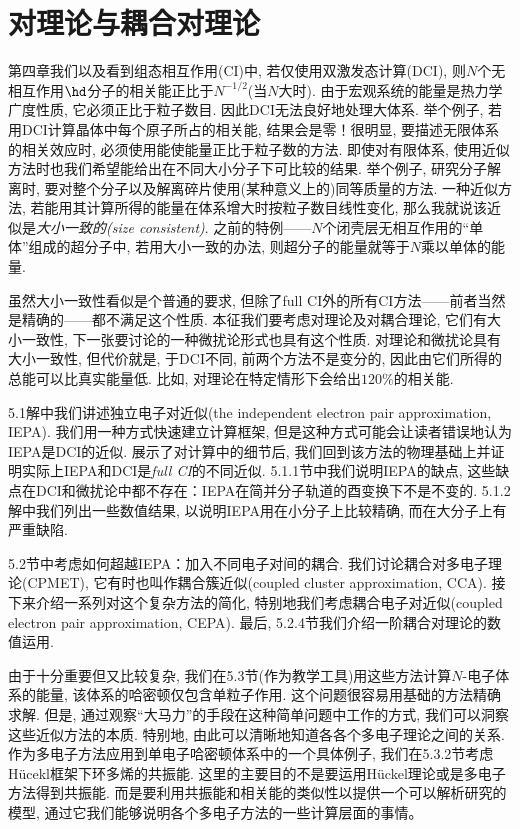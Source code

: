 \chapter{对理论与耦合对理论}
第四章我们以及看到组态相互作用(CI)中, 若仅使用双激发态计算(DCI), 则$N$个无相互作用$\hd$分子的相关能正比于$N^{-1/2}$(当$N$大时). 由于宏观系统的能量是热力学广度性质, 它必须正比于粒子数目. 因此DCI无法良好地处理大体系. 举个例子, 若用DCI计算晶体中每个原子所占的相关能, 结果会是零！很明显, 要描述无限体系的相关效应时, 必须使用能使能量正比于粒子数的方法. 即使对有限体系, 使用近似方法时也我们希望能给出在不同大小分子下可比较的结果. 举个例子, 研究分子解离时, 要对整个分子以及解离碎片使用(某种意义上的)同等质量的方法. 一种近似方法, 若能用其计算所得的能量在体系增大时按粒子数目线性变化, 那么我就说该近似是\emph{大小一致的(size consistent)}. 之前的特例——$N$个闭壳层无相互作用的``单体''组成的超分子中, 若用大小一致的办法, 则超分子的能量就等于$N$乘以单体的能量.

虽然大小一致性看似是个普通的要求, 但除了full CI外的所有CI方法——前者当然是精确的——都不满足这个性质. 本征我们要考虑对理论及对耦合理论, 它们有大小一致性, 下一张要讨论的一种微扰论形式也具有这个性质. 对理论和微扰论具有大小一致性, 但代价就是, 于DCI不同, 前两个方法不是变分的, 因此由它们所得的总能可以比真实能量低. 比如, 对理论在特定情形下会给出$120\%$的相关能.

5.1解中我们讲述独立电子对近似(the independent electron pair approximation, IEPA). 我们用一种方式快速建立计算框架, 但是这种方式可能会让读者错误地认为IEPA是DCI的近似. 展示了对计算中的细节后, 我们回到该方法的物理基础上并证明实际上IEPA和DCI是\emph{full CI}的不同近似. 5.1.1节中我们说明IEPA的缺点, 这些缺点在DCI和微扰论中都不存在：IEPA在简并分子轨道的酉变换下不是不变的. 5.1.2解中我们列出一些数值结果, 以说明IEPA用在小分子上比较精确, 而在大分子上有严重缺陷.

5.2节中考虑如何超越IEPA：加入不同电子对间的耦合. 我们讨论耦合对多电子理论(CPMET), 它有时也叫作耦合簇近似(coupled cluster approximation, CCA). 接下来介绍一系列对这个复杂方法的简化, 特别地我们考虑耦合电子对近似(coupled electron pair approximation, CEPA). 最后, 5.2.4节我们介绍一阶耦合对理论的数值运用.

由于十分重要但又比较复杂, 我们在5.3节(作为教学工具)用这些方法计算$N$-电子体系的能量, 该体系的哈密顿仅包含单粒子作用. 这个问题很容易用基础的方法精确求解. 但是, 通过观察``大马力''的手段在这种简单问题中工作的方式, 我们可以洞察这些近似方法的本质. 特别地, 由此可以清晰地知道各各个多电子理论之间的关系. 作为多电子方法应用到单电子哈密顿体系中的一个具体例子, 我们在5.3.2节考虑H\"ucekl框架下环多烯的共振能. 这里的主要目的不是要运用H\"uckel理论或是多电子方法得到共振能. 而是要利用共振能和相关能的类似性以提供一个可以解析研究的模型, 通过它我们能够说明各个多电子方法的一些计算层面的事情。
